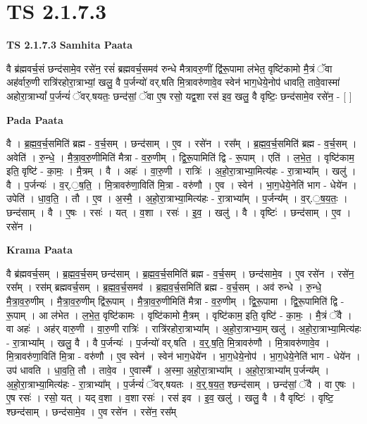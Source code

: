 \documentclass[17pt]{extarticle}
\begin{document}
\section{ TS 2.1.7.3 }

\textbf{TS 2.1.7.3 } \newline
\textbf{Samhita Paata} \newline

वै ब्र॑ह्मवर्च॒सं छन्द॑सामे॒व रसे॑न॒ रसं॑ ब्रह्मवर्च॒समव॑ रुन्धे मैत्रावरु॒णीं द्वि॑रू॒पामा ल॑भेत॒ वृष्टि॑कामो मै॒त्रं ॅवा अह॑र्वारु॒णी रात्रि॑रहोरा॒त्राभ्यां॒ खलु॒ वै प॒र्जन्यो॑ वर्.षति मि॒त्रावरु॑णावे॒व स्वेन॑ भाग॒धेये॒नोप॑ धावति॒ तावे॒वास्मा॑ अहोरा॒त्राभ्यां᳚ प॒र्जन्यं॑ ॅवर्.षयतः॒ छन्द॑सां॒ ॅवा ए॒ष रसो॒ यद्व॒शा रस॑ इव॒ खलु॒ वै वृष्टिः॒ छन्द॑सामे॒व रसे॑न॒ - [  ] \newline

\textbf{Pada Paata} \newline

वै । ब्र॒ह्म॒व॒र्च॒समिति॑ ब्रह्म - व॒र्च॒सम् । छन्द॑साम् । ए॒व । रसे॑न । रस᳚म् । ब्र॒ह्म॒व॒र्च॒समिति॑ ब्रह्म - व॒र्च॒सम् । अवेति॑ । रु॒न्धे॒ । मै॒त्रा॒व॒रु॒णीमिति॑ मैत्रा - व॒रु॒णीम् । द्वि॒रू॒पामिति॑ द्वि - रू॒पाम् । एति॑ । ल॒भे॒त॒ । वृष्टि॑काम॒ इति॒ वृष्टि॑ - का॒मः॒ । मै॒त्रम् । वै । अहः॑ । वा॒रु॒णी । रात्रिः॑ । अ॒हो॒रा॒त्राभ्या॒मित्य॑हः - रा॒त्राभ्या᳚म् । खलु॑ । वै । प॒र्जन्यः॑ । व॒र्.॒ष॒ति॒ । मि॒त्रावरु॑णा॒विति॑ मि॒त्रा - वरु॑णौ । ए॒व । स्वेन॑ । भा॒ग॒धेये॒नेति॑ भाग - धेये॑न । उपेति॑ । धा॒व॒ति॒ । तौ । ए॒व । अ॒स्मै॒ । अ॒हो॒रा॒त्राभ्या॒मित्य॑हः - रा॒त्राभ्या᳚म् । प॒र्जन्य᳚म् । व॒र्.॒ष॒य॒तः॒ । छन्द॑साम् । वै । ए॒षः । रसः॑ । यत् । व॒शा । रसः॑ । इ॒व॒ । खलु॑ । वै । वृष्टिः॑ । छन्द॑साम् । ए॒व । रसे॑न ।  \newline


\textbf{Krama Paata} \newline

वै ब्र॑ह्मवर्च॒सम् । ब्र॒ह्म॒व॒र्च॒सम् छन्द॑साम् । ब्र॒ह्म॒व॒र्च॒समिति॑ ब्रह्म - व॒र्च॒सम् । छन्द॑सामे॒व । ए॒व रसे॑न । रसे॑न॒ रस᳚म् । रस॑म् ब्रह्मवर्च॒सम् । ब्र॒ह्म॒व॒र्च॒समव॑ । ब्र॒ह्म॒व॒र्च॒समिति॑ ब्रह्म - व॒र्च॒सम् । अव॑ रुन्धे । रु॒न्धे॒ मै॒त्रा॒व॒रु॒णीम् । मै॒त्रा॒व॒रु॒णीम् द्वि॑रू॒पाम् । मै॒त्रा॒व॒रु॒णीमिति॑ मैत्रा - व॒रु॒णीम् । द्वि॒रू॒पामा । द्वि॒रू॒पामिति॑ द्वि - रू॒पाम् । आ ल॑भेत । ल॒भे॒त॒ वृष्टि॑कामः । वृष्टि॑कामो मै॒त्रम् । वृष्टि॑काम॒ इति॒ वृष्टि॑ - का॒मः॒ । मै॒त्रं ॅवै । वा अहः॑ । अह॑र् वारु॒णी । वा॒रु॒णी रात्रिः॑ । रात्रि॑रहोरा॒त्राभ्या᳚म् । अ॒हो॒रा॒त्राभ्या॒म् खलु॑ । अ॒हो॒रा॒त्राभ्या॒मित्य॑हः - रा॒त्राभ्या᳚म् । खलु॒ वै । वै प॒र्जन्यः॑ । प॒र्जन्यो॑ वर्.षति । व॒र्॒.ष॒ति॒ मि॒त्रावरु॑णौ । मि॒त्रावरु॑णावे॒व । मि॒त्रावरु॑णा॒विति॑ मि॒त्रा - वरु॑णौ । ए॒व स्वेन॑ । स्वेन॑ भाग॒धेये॑न । भा॒ग॒धेये॒नोप॑ । भा॒ग॒धेये॒नेति॑ भाग - धेये॑न । उप॑ धावति । धा॒व॒ति॒ तौ । तावे॒व । ए॒वास्मै᳚ । अ॒स्मा॒ अ॒हो॒रा॒त्राभ्या᳚म् । अ॒हो॒रा॒त्राभ्या᳚म् प॒र्जन्य᳚म् । अ॒हो॒रा॒त्राभ्या॒मित्य॑हः - रा॒त्राभ्या᳚म् । प॒र्जन्यं॑ ॅवर्.षयतः । व॒र्॒.ष॒य॒त॒ श्छन्द॑साम् । छन्द॑सां॒ ॅवै । वा ए॒षः । ए॒ष रसः॑ । रसो॒ यत् । यद् व॒शा । व॒शा रसः॑ । रस॑ इव । इ॒व॒ खलु॑ । खलु॒ वै । वै वृष्टिः॑ । वृष्टि॒ श्छन्द॑साम् । छन्द॑सामे॒व । ए॒व रसे॑न । रसे॑न॒ रस᳚म् \newline
\end{document}
